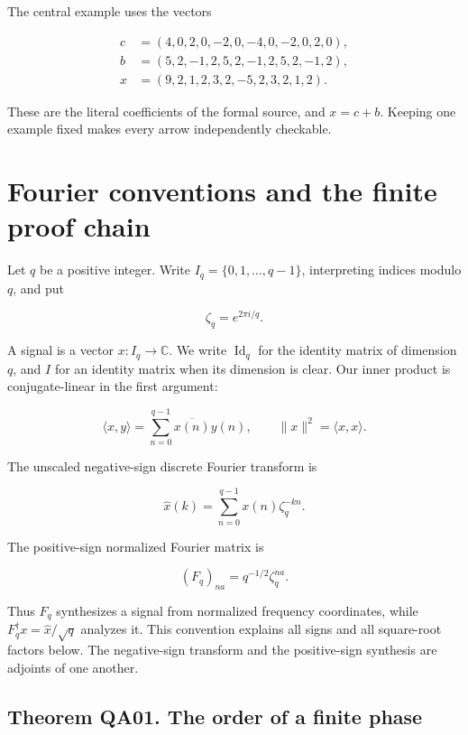 The central example uses the vectors

\[
\begin{aligned}
c&=(4,0,2,0,-2,0,-4,0,-2,0,2,0),\\
b&=(5,2,-1,2,5,2,-1,2,5,2,-1,2),\\
x&=(9,2,1,2,3,2,-5,2,3,2,1,2).
\end{aligned}
\]

These are the literal coefficients of the formal source, and \(x=c+b\).
Keeping one example fixed makes every arrow independently checkable.

\hypertarget{fourier-conventions-and-the-finite-proof-chain}{%
\section{Fourier conventions and the finite proof
chain}\label{fourier-conventions-and-the-finite-proof-chain}}

Let \(q\) be a positive integer. Write \(I_q=\{0,1,\ldots,q-1\}\),
interpreting indices modulo \(q\), and put

\[
\zeta_q=e^{2\pi i/q}.
\]

A signal is a vector \(x:I_q\to\mathbb C\). We write \(\operatorname{Id}_q\) for the identity matrix of dimension \(q\), and \(I\) for an identity matrix when its dimension is clear. Our inner product is
conjugate-linear in the first argument:

\[
\langle x,y\rangle=\sum_{n=0}^{q-1}\overline{x(n)}y(n),
\qquad \|x\|^2=\langle x,x\rangle.
\]

The unscaled negative-sign discrete Fourier transform is

\[
\widehat{x}(k)=\sum_{n=0}^{q-1}x(n)\zeta_q^{-kn}.
\]

The positive-sign normalized Fourier matrix is

\[
(F_q)_{na}=q^{-1/2}\zeta_q^{na}.
\]

Thus \(F_q\) synthesizes a signal from normalized frequency coordinates,
while \(F_q^\dagger x=\widehat{x}/\sqrt q\) analyzes it. This convention
explains all signs and all square-root factors below. The negative-sign
transform and the positive-sign synthesis are adjoints of one another.

\hypertarget{theorem-qa01.-the-order-of-a-finite-phase}{%
\subsection*{Theorem QA01. The order of a finite
phase}\label{theorem-qa01.-the-order-of-a-finite-phase}}

